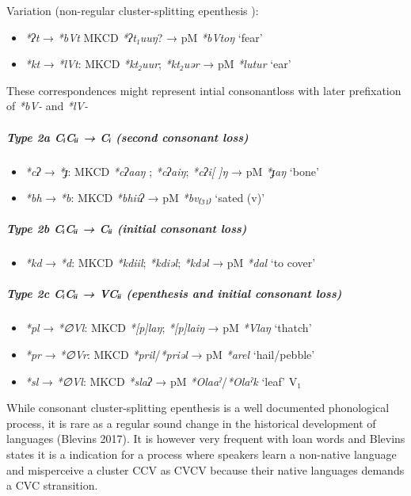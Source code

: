 \documentclass[a4paper,]{article}
\providecommand{\tightlist}{%
  \setlength{\itemsep}{0pt}\setlength{\parskip}{0pt}}
\let\oldsubparagraph\subparagraph
\renewcommand{\subparagraph}[1]{\oldsubparagraph{#1}\mbox{}}
\begin{document}
Variation (non-regular cluster-splitting epenthesis ):

\begin{itemize}
\tightlist
\item
  \emph{*ʔt} → \emph{*bVt} MKCD \emph{*ʔt₁uuŋ}? → pM \emph{*bVtoŋ}
  `fear'
\item
  \emph{*kt} → \emph{*lVt}: MKCD \emph{*kt₂uur}; \emph{*kt₂uər} → pM
  \emph{*lutur} `ear'
\end{itemize}

These correspondences might represent intial consonantloss with later
prefixation of \emph{*bV-} and \emph{*lV-}

\subparagraph{Type 2a CᵢCᵢᵢ → Cᵢ (second consonant
loss)}\label{type-2a-cux1d62cux1d62ux1d62-cux1d62-second-consonant-loss}

\begin{itemize}
\tightlist
\item
  \emph{*cʔ} → \emph{*ɟ}: MKCD \emph{*cʔaaŋ} ; \emph{*cʔaiŋ};
  \emph{*cʔi{[} {]}ŋ} → pM \emph{*ɟaŋ} `bone'
\item
  \emph{*bh} → \emph{*b}: MKCD \emph{*bhiiʔ} → pM \emph{*bv₍₃₁₎} `sated
  (v)'
\end{itemize}

\subparagraph{Type 2b CᵢCᵢᵢ → Cᵢᵢ (initial consonant
loss)}\label{type-2b-cux1d62cux1d62ux1d62-cux1d62ux1d62-initial-consonant-loss}

\begin{itemize}
\tightlist
\item
  \emph{*kd} → \emph{*d}: MKCD \emph{*kdiil}; \emph{*kdiəl};
  \emph{*kdəl} → pM \emph{*dal} `to cover'
\end{itemize}

\subparagraph{Type 2c CᵢCᵢᵢ → VCᵢᵢ (epenthesis and initial consonant
loss)}\label{type-2c-cux1d62cux1d62ux1d62-vcux1d62ux1d62-epenthesis-and-initial-consonant-loss}

\begin{itemize}
\tightlist
\item
  \emph{*pl} → \emph{*∅Vl}: MKCD \emph{*{[}p{]}laŋ}; \emph{*{[}p{]}laiŋ}
  → pM \emph{*Vlaŋ} `thatch'
\item
  \emph{*pr} → \emph{*∅Vr}: MKCD \emph{*pril}/\emph{*priəl} → pM
  \emph{*arel} `hail/pebble'
\item
  \emph{*sl} → \emph{*∅Vl}: MKCD \emph{*slaʔ} → pM
  \emph{*Olaaˀ}/\emph{*Olaˀk} `leaf' V₁
\end{itemize}

While consonant cluster-splitting epenthesis is a well documented
phonological process, it is rare as a regular sound change in the
historical development of languages (Blevins 2017). It is however very
frequent with loan words and Blevins states it is a indication for a
process where speakers learn a non-native language and misperceive a
cluster CCV as CVCV because their native languages demands a CVC
stransition.
\end{document}
